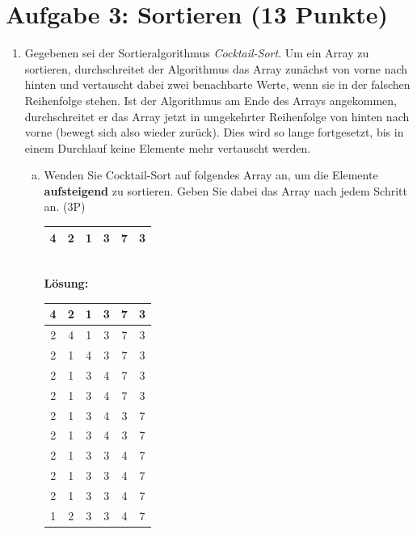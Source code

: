 \documentclass{scrartcl}
\begin{document}
\section*{Aufgabe 3: Sortieren (13 Punkte)}
\begin{enumerate}[(1)]
\item Gegebenen sei der Sortieralgorithmus \emph{Cocktail-Sort}. Um ein Array zu sortieren, durchschreitet der Algorithmus das Array zun\"achst von vorne nach hinten und vertauscht dabei zwei benachbarte Werte, wenn sie in der falschen Reihenfolge stehen. Ist der Algorithmus am Ende des Arrays angekommen, durchschreitet er das Array jetzt in umgekehrter Reihenfolge von hinten nach vorne (bewegt sich also \glqq wieder zur\"uck\grqq). Dies wird so lange fortgesetzt, bis in einem Durchlauf keine Elemente mehr vertauscht werden.
\begin{enumerate}[(a)]
\item Wenden Sie Cocktail-Sort auf folgendes Array an, um die Elemente \textbf{aufsteigend} zu sortieren. Geben Sie dabei das Array nach jedem Schritt an. (3P)
\\
\begin{center}
\begin{tabular}{|c|c|c|c|c|c|}
\hline
4 & 2 & 1 & 3 & 7 & 3 \\
\hline
\end{tabular}
\end{center}
\text{ } \\
\textbf{Lösung:}\\
\begin{center}
\begin{tabular}{|c|c|c|c|c|c|}
\hline
4 & 2 & 1 & 3 & 7 & 3 \\
\hline
2 & 4 & 1 & 3 & 7 & 3 \\
\hline
2 & 1 & 4 & 3 & 7 & 3 \\
\hline
2 & 1 & 3 & 4 & 7 & 3 \\
\hline
2 & 1 & 3 & 4 & 7 & 3 \\
\hline
2 & 1 & 3 & 4 & 3 & 7 \\
\hline
2 & 1 & 3 & 4 & 3 & 7 \\
\hline
2 & 1 & 3 & 3 & 4 & 7 \\
\hline
2 & 1 & 3 & 3 & 4 & 7 \\
\hline
2 & 1 & 3 & 3 & 4 & 7 \\
\hline
1 & 2 & 3 & 3 & 4 & 7 \\
\hline
\end{tabular}
\end{center}


\end{enumerate}
\end{enumerate}
\end{document}
